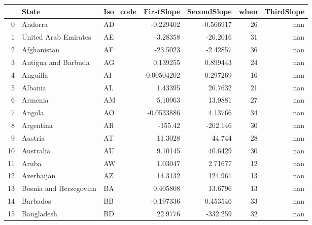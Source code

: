 \begin{tabular}{rllrrrr}
\hline
    & State                            & Iso\_code   &    FirstSlope &   SecondSlope &   when &   ThirdSlope \\
\hline
  0 & Andorra                          & AD         &   -0.229402   &    -0.566917  &     26 &     nan      \\
  1 & United Arab Emirates             & AE         &   -3.28358    &   -20.2016    &     31 &     nan      \\
  2 & Afghanistan                      & AF         &  -23.5023     &    -2.42857   &     36 &     nan      \\
  3 & Antigua and Barbuda              & AG         &    0.139255   &     0.899443  &     24 &     nan      \\
  4 & Anguilla                         & AI         &   -0.00504202 &     0.297269  &     16 &     nan      \\
  5 & Albania                          & AL         &    1.43395    &    26.7632    &     21 &     nan      \\
  6 & Armenia                          & AM         &    5.10963    &    13.9881    &     27 &     nan      \\
  7 & Angola                           & AO         &   -0.0533886  &     4.13766   &     34 &     nan      \\
  8 & Argentina                        & AR         & -155.42       &  -202.146     &     30 &     nan      \\
  9 & Austria                          & AT         &   11.3028     &    44.744     &     28 &     nan      \\
 10 & Australia                        & AU         &    9.10145    &    40.6429    &     30 &     nan      \\
 11 & Aruba                            & AW         &    1.03047    &     2.71677   &     12 &     nan      \\
 12 & Azerbaijan                       & AZ         &   14.3132     &   124.961     &     13 &     nan      \\
 13 & Bosnia and Herzegovina           & BA         &    0.405808   &    13.6796    &     13 &     nan      \\
 14 & Barbados                         & BB         &   -0.197336   &     0.453546  &     33 &     nan      \\
 15 & Bangladesh                       & BD         &   22.9776     &  -332.259     &     32 &     nan      \\

\end{tabular}
